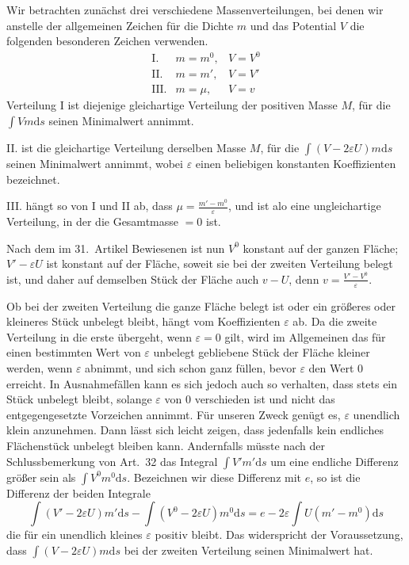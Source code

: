 Wir betrachten zunächst drei verschiedene Massenverteilungen, bei denen wir anstelle der allgemeinen Zeichen für die Dichte $m$ und das Potential $V$ die folgenden besonderen Zeichen verwenden.
\[
\begin{array}{rll}
\mathrm{I.}&m=m^0,&V=V^0\\
\mathrm{II.}&m=m',&V=V'\\
\mathrm{III.}&m=\mu,&V=v
\end{array}
\]
Verteilung I ist diejenige gleichartige Verteilung der positiven Masse $M$, für die $\int Vm\mathrm ds$ seinen Minimalwert annimmt.

II. ist die gleichartige Verteilung derselben Masse $M$, für die $\int(V-2\varepsilon U)m\mathrm ds$ seinen Minimalwert annimmt, wobei $\varepsilon$ einen beliebigen konstanten Koeffizienten bezeichnet.

III. hängt so von I und II ab, dass $\mu=\frac{m'-m^0}{\varepsilon}$, und ist alo eine ungleichartige Verteilung, in der die Gesamtmasse $=0$ ist.

Nach dem im 31.\ Artikel Bewiesenen ist nun $V^0$ konstant auf der ganzen
Fläche; $V'-\varepsilon U$ ist konstant auf der Fläche, soweit sie bei der zweiten Verteilung belegt ist, und daher auf demselben Stück der Fläche auch $v-U$, denn $v=\frac{V'-V^0}{\varepsilon}$.

Ob bei der zweiten Verteilung die ganze Fläche belegt ist oder ein größeres oder kleineres Stück unbelegt bleibt, hängt vom Koeffizienten $\varepsilon$ ab. Da die zweite Verteilung in die erste übergeht, wenn $\varepsilon=0$ gilt, wird im Allgemeinen das für einen bestimmten Wert von $\varepsilon$ unbelegt gebliebene Stück der Fläche kleiner werden, wenn $\varepsilon$ abnimmt, und sich schon ganz füllen, bevor $\varepsilon$ den Wert $0$ erreicht. In Ausnahmefällen kann es sich jedoch auch so verhalten, dass stets ein Stück unbelegt bleibt, solange $\varepsilon$ von $0$ verschieden ist und nicht das entgegengesetzte Vorzeichen annimmt. Für unseren Zweck genügt es, $\varepsilon$ unendlich klein anzunehmen. Dann lässt sich leicht zeigen, dass jedenfalls kein endliches Flächenstück unbelegt bleiben kann. Andernfalls müsste nach der Schlussbemerkung von Art.\ 32 das Integral $\int V'm'\mathrm ds$ um eine endliche Differenz größer sein als $\int V^0m^0\mathrm ds$. Bezeichnen wir diese Differenz mit $e$, so ist die Differenz der beiden Integrale
\[
\int(V'-2\varepsilon U)m'\mathrm ds-\int(V^0-2\varepsilon U)m^0\mathrm ds=e-2\varepsilon\int U(m'-m^0)\mathrm ds
\]
die für ein unendlich kleines $\varepsilon$ positiv bleibt. Das widerspricht der Voraussetzung, dass $\int(V-2\varepsilon U)m\mathrm ds$ bei der zweiten Verteilung seinen Minimalwert hat.

